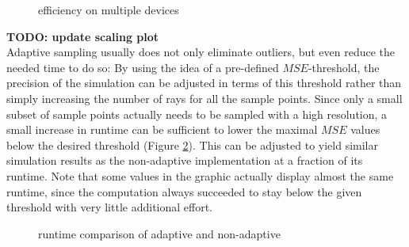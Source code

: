 \begin{figure}[H]
  \centerline{
    }
  \caption{efficiency on multiple devices}
  \label{plot:gpu_scaling}
\end{figure}
\textbf{TODO: update scaling plot}\\
Adaptive sampling usually does not only eliminate outliers, but even reduce the
needed time to do so: By using the idea of a pre-defined $MSE$-threshold, the
precision of the simulation can be adjusted in terms of this threshold rather than
simply increasing the number of rays for all the sample points. Since only a
small subset of sample points actually needs to be sampled with a high
resolution, a small increase in runtime can be sufficient to lower the maximal
$MSE$ values below the desired threshold (Figure \ref{plot:adaptive_runtime}).
This can be adjusted to yield similar simulation results as the non-adaptive
implementation at a fraction of its runtime. Note that some values in the
graphic actually display almost the same runtime, since the computation always
succeeded to stay below the given threshold with very little additional effort.
\begin{figure}[H]
  \centerline{
    }
  \caption{runtime comparison of adaptive and non-adaptive }
  \label{plot:adaptive_runtime}
\end{figure}
